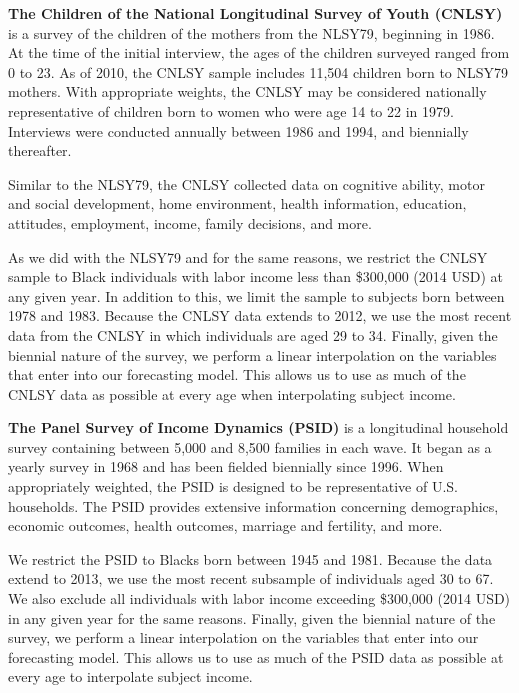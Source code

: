 \noindent\textbf{The Children of the National Longitudinal Survey of Youth (CNLSY)} is a survey of the children of the mothers from the NLSY79, beginning in 1986. At the time of the initial interview, the ages of the children surveyed ranged from 0 to 23. As of 2010, the CNLSY sample includes 11,504 children born to NLSY79 mothers. With appropriate weights, the CNLSY may be considered nationally representative of children born to women who were age 14 to 22 in 1979. Interviews were conducted annually between 1986 and 1994, and biennially thereafter.

\noindent Similar to the NLSY79, the CNLSY collected data on cognitive ability, motor and social development, home environment, health information, education, attitudes, employment, income, family decisions, and more.

\noindent As we did with the NLSY79 and for the same reasons, we restrict the CNLSY sample to Black individuals with labor income less than \$300,000 (2014 USD) at any given year. In addition to this, we limit the sample to subjects born between 1978 and 1983. Because the CNLSY data extends to 2012, we use the most recent data from the CNLSY in which individuals are aged 29 to 34. Finally, given the biennial nature of the survey, we perform a linear interpolation on the variables that enter into our forecasting model. This allows us to use as much of the CNLSY data as possible at every age when interpolating subject income.

\noindent\textbf{The Panel Survey of Income Dynamics (PSID)} is a longitudinal household survey containing between 5,000 and 8,500 families in each wave. It began as a yearly survey in 1968 and has been fielded biennially since 1996. When appropriately weighted, the PSID is designed to be representative of U.S. households. The PSID provides extensive information concerning demographics, economic outcomes, health outcomes, marriage and fertility, and more.

\noindent We restrict the PSID to Blacks born between 1945 and 1981. Because the data extend to 2013, we use the most recent subsample of individuals aged 30 to 67. We also exclude all individuals with labor income exceeding \$300,000 (2014 USD) in any given year for the same reasons. Finally, given the biennial nature of the survey, we perform a linear interpolation on the variables that enter into our forecasting model. This allows us to use as much of the PSID data as possible at every age to interpolate subject income.


